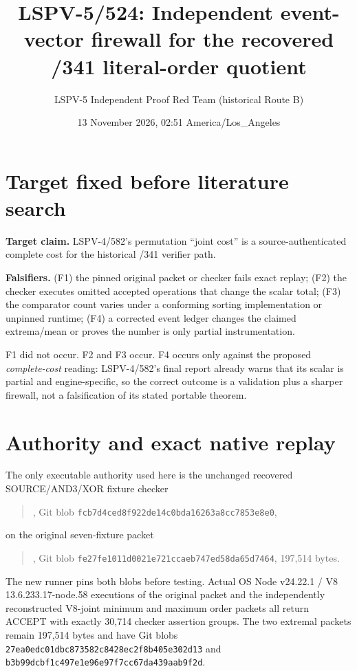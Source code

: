 \documentclass[11pt]{article}
\title{LSPV-5/524: Independent event-vector firewall for the recovered /341 literal-order quotient}
\author{LSPV-5 Independent Proof Red Team (historical Route B)}
\date{13 November 2026, 02:51 America/Los\_Angeles}
\begin{document}
\maketitle

\begin{center}
\end{center}

\section*{Target fixed before literature search}
\textbf{Target claim.} LSPV-4/582's permutation ``joint cost'' is a source-authenticated complete cost for the historical /341 verifier path.

\textbf{Falsifiers.} (F1) the pinned original packet or checker fails exact replay; (F2) the checker executes omitted accepted operations that change the scalar total; (F3) the comparator count varies under a conforming sorting implementation or unpinned runtime; (F4) a corrected event ledger changes the claimed extrema/mean or proves the number is only partial instrumentation.

F1 did not occur.  F2 and F3 occur.  F4 occurs only against the proposed \emph{complete-cost} reading: LSPV-4/582's final report already warns that its scalar is partial and engine-specific, so the correct outcome is a validation plus a sharper firewall, not a falsification of its stated portable theorem.

\section*{Authority and exact native replay}
The only executable authority used here is the unchanged recovered SOURCE/AND3/XOR fixture checker
\begin{quote}\small
{}, Git blob
\texttt{fcb7d4ced8f922de14c0bda16263a8cc7853e8e0},
\end{quote}
on the original seven-fixture packet
\begin{quote}\small
{}, Git blob
\texttt{fe27fe1011d0021e721ccaeb747ed58da65d7464}, 197,514 bytes.
\end{quote}
The new runner pins both blobs before testing.  Actual OS Node v24.22.1 / V8 13.6.233.17-node.58 executions of the original packet and the independently reconstructed V8-joint minimum and maximum order packets all return ACCEPT with exactly 30,714 checker assertion groups.  The two extremal packets remain 197,514 bytes and have Git blobs
\texttt{27ea0edc01dbc873582c8428ec2f8b405e302d13} and
\texttt{b3b99dcbf1c497e1e96e97f7cc67da439aab9f2d}.
\end{document}
